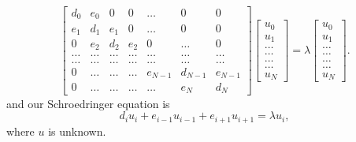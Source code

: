 \documentclass[12pt]{article}
\begin{document}
\begin{equation}
    \begin{bmatrix}
        d_0    & e_0   & 0     & 0      & \dots & 0     & 0 \\
        e_1    & d_1   & e_1   & 0      & \dots & 0     &0 \\
        0      & e_2   & d_2   & e_2    & 0     & \dots & 0\\
        \dots  & \dots & \dots & \dots  & \dots & \dots & \dots\\
        \dots  & \dots & \dots & \dots  & \dots & \dots & \dots\\
        0      & \dots & \dots & \dots  & e_{N-1}     &d_{N-1} & e_{N-1}\\
        0      & \dots & \dots & \dots  & \dots & e_{N} & d_{N}
    \end{bmatrix}
    \begin{bmatrix} 
        u_{0} \\ u_{1} \\ \dots\\ \dots\\ \dots\\ \dots\\ u_{N} 
    \end{bmatrix}
    =\lambda \begin{bmatrix} 
        u_{0} \\ u_{1} \\ \dots\\ \dots\\ \dots\\ \dots\\ u_{N}
    \end{bmatrix}.  
    \label{eq:sematrix}
\end{equation}
and our Schroedringer equation is
\begin{equation*}
d_iu_i+e_{i-1}u_{i-1}+e_{i+1}u_{i+1}  = \lambda u_i,
\end{equation*}
where $u$ is unknown. 
\end{document}
